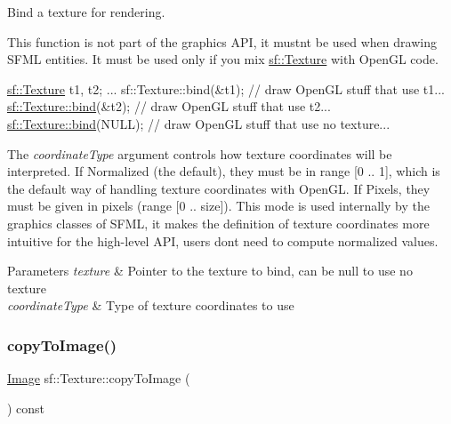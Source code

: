 Bind a texture for rendering. 

This function is not part of the graphics A\+PI, it mustn\textquotesingle{}t be used when drawing S\+F\+ML entities. It must be used only if you mix \hyperlink{classsf_1_1_texture}{sf\+::\+Texture} with Open\+GL code.


\begin{DoxyCode}
\hyperlink{classsf_1_1_texture}{sf::Texture} t1, t2;
...
sf::Texture::bind(&t1);
\textcolor{comment}{// draw OpenGL stuff that use t1...}
\hyperlink{classsf_1_1_texture_ae9a4274e7b95ebf7244d09c7445833b0}{sf::Texture::bind}(&t2);
\textcolor{comment}{// draw OpenGL stuff that use t2...}
\hyperlink{classsf_1_1_texture_ae9a4274e7b95ebf7244d09c7445833b0}{sf::Texture::bind}(NULL);
\textcolor{comment}{// draw OpenGL stuff that use no texture...}
\end{DoxyCode}


The {\itshape coordinate\+Type} argument controls how texture coordinates will be interpreted. If Normalized (the default), they must be in range \mbox{[}0 .. 1\mbox{]}, which is the default way of handling texture coordinates with Open\+GL. If Pixels, they must be given in pixels (range \mbox{[}0 .. size\mbox{]}). This mode is used internally by the graphics classes of S\+F\+ML, it makes the definition of texture coordinates more intuitive for the high-\/level A\+PI, users don\textquotesingle{}t need to compute normalized values.


\begin{DoxyParams}{Parameters}
{\em texture} & Pointer to the texture to bind, can be null to use no texture \\
\hline
{\em coordinate\+Type} & Type of texture coordinates to use \\
\hline
\end{DoxyParams}
\mbox{\label{classsf_1_1_texture_a77e18a70de2e525ac5e4a7cd95f614b9}} 
\subsubsection{\texorpdfstring{copy\+To\+Image()}{copyToImage()}}
{\footnotesize\ttfamily \hyperlink{classsf_1_1_image}{Image} sf\+::\+Texture\+::copy\+To\+Image (\begin{DoxyParamCaption}{ }\end{DoxyParamCaption}) const}




